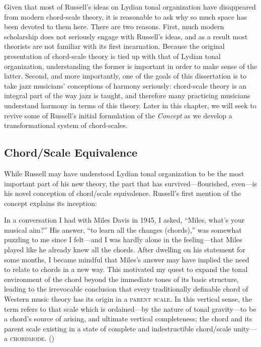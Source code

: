 Given that most of Russell's ideas on Lydian tonal organization have
disappeared from modern chord-scale theory, it is reasonable to ask why so
much space has been devoted to them here. There are two reasons. First, much
modern scholarship does not seriously engage with Russell's ideas, and as a
result most theorists are not familiar with its first incarnation. Because the
original presentation of chord-scale theory is tied up with that of Lydian
tonal organization, understanding the former is important in order to make
sense of the latter. Second, and more importantly, one of the goals of this
dissertation is to take jazz musicians' conceptions of harmony seriously:
chord-scale theory is an integral part of the way jazz is taught, and
therefore many practicing musicians understand harmony in terms of this
theory. Later in this chapter, we will seek to revive some of Russell's
initial formulation of the \emph{Concept} as we develop a transformational
system of chord-scales.

\subsection{Chord/Scale Equivalence}
\label{subsec:chord-scales}

While Russell may have understood Lydian tonal organization to be the most
important part of his new theory, the part that has survived---flourished,
even---is his novel conception of chord/scale equivalence.
Russell's first mention of the concept explains its inception:%
%
\begin{quoting}
  \singlespacing
  In a conversation I had with Miles Davis in 1945, I asked, ``Miles, what's
  your musical aim?'' His answer, ``to learn all the changes (chords),'' was
  somewhat puzzling to me since I felt---and I was hardly alone in the
  feeling---that Miles played like he already knew all the chords. After
  dwelling on his statement for some months, I became mindful that Miles's
  answer may have implied the need to relate to chords in a new way. This
  motivated my quest to expand the tonal environment of the chord beyond the
  immediate tones of its basic structure, leading to the irrevocable conclusion
  that every traditionally definable chord of Western music theory has its
  origin in a \textsc{parent scale}. In this vertical sense, the term refers to
  that scale which is ordained---by the nature of tonal gravity---to be a
  chord's source of arising, and ultimate vertical completeness; the chord and
  its parent scale existing in a state of complete and indestructible
  chord/scale unity---a \textsc{chordmode}. ()
\end{quoting}

